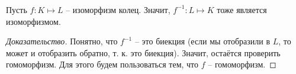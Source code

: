 \begin{frame}[t]
    \frametitle{}
    \framesubtitle{}

    \begin{lemma}
        Пусть $f: K \mapsto L$ -- изоморфизм колец. Значит, $f^{-1}: L \mapsto K$ тоже является изоморфизмом.
    \end{lemma}

    \begin{proof}[Доказательство]
       Понятно, что $f^{-1}$ -- это биекция (если мы отобразили в $L$, то может и отобразить обратно, т. к. это биекция). Значит, остаётся проверить гомоморфизм. Для этого будем пользоваться тем, что  $f$ -- гомоморфизм.

    \end{proof}
\end{frame}


